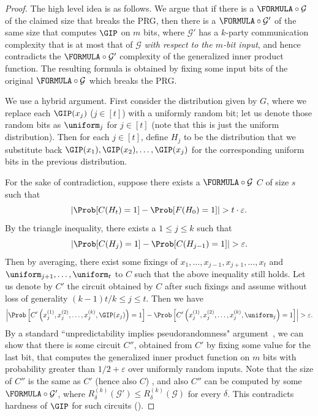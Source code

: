 	\begin{proof}
		The high level idea is as follows. We argue that if there is a $\FORMULA \circ \mathcal{G}$ of the claimed size that breaks the PRG, then there is a $\FORMULA \circ \mathcal{G'}$ of the same size that computes $\GIP$ on $m$ bits, where $\mathcal{G'}$ has a $k$-party communication complexity that is at most that of $\mathcal{G}$ \emph{with respect to the $m$-bit input}, and hence contradicts the $\FORMULA \circ \mathcal{G'}$ complexity of the generalized inner product function. The resulting formula is obtained by fixing some input bits of the original $\FORMULA \circ \mathcal{G}$ which breaks the PRG.

		We use a hybrid argument. First consider the distribution given by $G$, where we replace each $\GIP(x_j)$ ($j\in[t]$) with a uniformly random bit; let us denote those random bits as $\uniform_{j}$ for $j\in[t]$ (note that this is just the uniform distribution). Then for each $j\in[t]$, define $H_j$ to be the distribution that we substitute back $\GIP(x_1),\GIP(x_2),\dots,\GIP(x_{j})$ for the corresponding uniform bits in the previous distribution. 

		For the sake of contradiction, suppose there exists a $\FORMULA \circ \mathcal{G}$ $C$ of size $s$ such that
		\[
			\left| \Prob[C(H_t)=1]-\Prob[F(H_0)=1] \right| > t\cdot\varepsilon.
		\]
		By the triangle inequality, there exists a $1\leq j\leq k$ such that
		\[
			\left| \Prob[C(H_j)=1]-\Prob[C(H_{j-1})=1] \right| >\varepsilon.
		\]
		Then by averaging, there exist some fixings of $x_1,\dots,x_{j-1},x_{j+1},\dots,x_{t}$ and $\uniform_{j+1},\dots,\uniform_{t}$ to $C$ such that the above inequality still holds. Let us denote by $C'$ the circuit obtained by $C$ after such fixings and assume without loss of generality $(k-1)t/k\leq j \leq t$. Then we have
		\begin{equation}\label{eq:distinguish}
		    \left| \Prob\left[C'\left(x_j^{(1)},x_j^{(2)},\dots,x_j^{(k)},\GIP(x_j)\right)=1\right]-\Prob\left[C'\left(x_j^{(1)},x_j^{(2)},\dots,x_j^{(k)},\uniform_j\right)=1\right] \right| > \varepsilon.
		\end{equation}
		By a standard ``unpredictability implies pseudorandomness" argument~\cite{Yao82}, we can show that there is some circuit $C''$, obtained from $C'$ by fixing some value for the last bit, that computes the generalized inner product function on $m$ bits with probability greater than $1/2+\varepsilon$ over uniformly random inputs. Note that the size of $C''$ is the same as $C'$ (hence also $C$) , and also $C''$ can be computed by some $\FORMULA \circ \mathcal{G'}$, where $R^{(k)}_{\delta}(\mathcal{G'})\leq R^{(k)}_{\delta}(\mathcal{G})$ for every $\delta$. This contradicts hardness of $\GIP$ for such circuits ().
	\end{proof}
	
